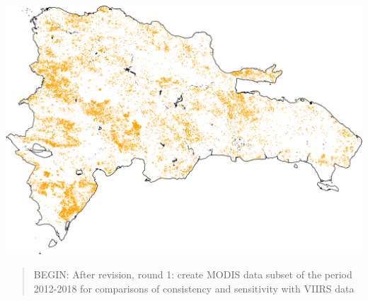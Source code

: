 \documentclass[10pt,landscape,a3paper]{article}
\begin{document}
\begin{center}\includegraphics{img/data-download-preparation-eda/fires-m6-v1-sel2-2} \end{center}

\begin{quote}
BEGIN: After revision, round 1: create MODIS data subset of the period
2012-2018 for comparisons of consistency and sensitivity with VIIRS data
\end{quote}
\end{document}
